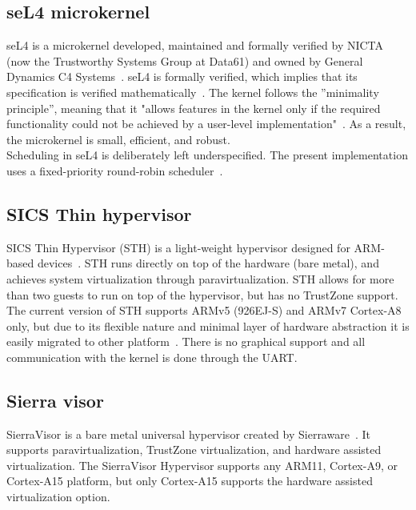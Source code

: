 \subsection{seL4 microkernel}
seL4 is a microkernel developed, maintained and formally verified by NICTA (now the Trustworthy Systems Group at Data61) and owned by General Dynamics C4 Systems~\cite{sel4}. seL4 is formally verified, which implies that its specification is verified mathematically~\cite{sel4math}. The kernel follows the ”minimality principle”, meaning that it "allows features in the kernel only if the required functionality could not be achieved by a user-level implementation"~\cite{lyons2014}. As a result, the microkernel is small, efficient, and robust.\\

Scheduling in seL4 is deliberately left underspecified. The present implementation uses a fixed-priority round-robin scheduler~\cite{lyons2014}.

\subsection{SICS Thin hypervisor}
SICS Thin Hypervisor (STH) is a light-weight hypervisor designed for ARM-based devices~\cite{STH2013}. STH runs directly on top of the hardware (bare metal), and achieves system virtualization through paravirtualization. STH allows for more than two guests to run on top of the hypervisor, but has no TrustZone support.\\

The current version of STH supports ARMv5 (926EJ-S) and ARMv7 Cortex-A8 only, but due to its flexible nature and minimal layer of hardware abstraction it is easily migrated to other platform~\cite{STH2013}. There is no graphical support and all communication with the kernel is done through the UART.

\subsection{Sierra visor}
SierraVisor is a bare metal universal hypervisor created by Sierraware~\cite{sierraware}. It supports paravirtualization, TrustZone virtualization, and hardware assisted virtualization. The SierraVisor Hypervisor supports any ARM11, Cortex-A9, or Cortex-A15 platform, but only Cortex-A15 supports the hardware assisted virtualization option. 

